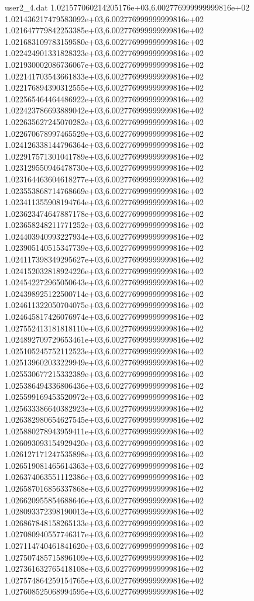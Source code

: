 \begin{filecontents}{user2_4.dat}
1.021577060214205176e+03,6.002776999999999816e+02
1.021436217479583092e+03,6.002776999999999816e+02
1.021647779842253385e+03,6.002776999999999816e+02
1.021683109783159580e+03,6.002776999999999816e+02
1.022424901331828323e+03,6.002776999999999816e+02
1.021930002086736067e+03,6.002776999999999816e+02
1.022141703543661833e+03,6.002776999999999816e+02
1.022176894390312555e+03,6.002776999999999816e+02
1.022565464464486922e+03,6.002776999999999816e+02
1.022423786693889042e+03,6.002776999999999816e+02
1.022635627245070282e+03,6.002776999999999816e+02
1.022670678997465529e+03,6.002776999999999816e+02
1.024126338144796364e+03,6.002776999999999816e+02
1.022917571301041789e+03,6.002776999999999816e+02
1.023129550946478730e+03,6.002776999999999816e+02
1.023164463604618277e+03,6.002776999999999816e+02
1.023553868714768669e+03,6.002776999999999816e+02
1.023411355908194764e+03,6.002776999999999816e+02
1.023623474647887178e+03,6.002776999999999816e+02
1.023658248211771252e+03,6.002776999999999816e+02
1.024403940993227934e+03,6.002776999999999816e+02
1.023905140515347739e+03,6.002776999999999816e+02
1.024117398349295627e+03,6.002776999999999816e+02
1.024152032818924226e+03,6.002776999999999816e+02
1.024542272965050643e+03,6.002776999999999816e+02
1.024398925122500714e+03,6.002776999999999816e+02
1.024611322050704075e+03,6.002776999999999816e+02
1.024645817426076974e+03,6.002776999999999816e+02
1.027552413181818110e+03,6.002776999999999816e+02
1.024892709729653461e+03,6.002776999999999816e+02
1.025105245752112523e+03,6.002776999999999816e+02
1.025139602033229949e+03,6.002776999999999816e+02
1.025530677215332389e+03,6.002776999999999816e+02
1.025386494336806436e+03,6.002776999999999816e+02
1.025599169453520972e+03,6.002776999999999816e+02
1.025633386640382923e+03,6.002776999999999816e+02
1.026382980654627545e+03,6.002776999999999816e+02
1.025880278943959411e+03,6.002776999999999816e+02
1.026093093154929420e+03,6.002776999999999816e+02
1.026127171247535898e+03,6.002776999999999816e+02
1.026519081465614363e+03,6.002776999999999816e+02
1.026374063551112386e+03,6.002776999999999816e+02
1.026587016856337868e+03,6.002776999999999816e+02
1.026620955854688646e+03,6.002776999999999816e+02
1.028093372398190013e+03,6.002776999999999816e+02
1.026867848158265133e+03,6.002776999999999816e+02
1.027080940557746317e+03,6.002776999999999816e+02
1.027114740461841620e+03,6.002776999999999816e+02
1.027507485715896109e+03,6.002776999999999816e+02
1.027361632765418108e+03,6.002776999999999816e+02
1.027574864259154765e+03,6.002776999999999816e+02
1.027608525068994595e+03,6.002776999999999816e+02

\end{filecontents}
